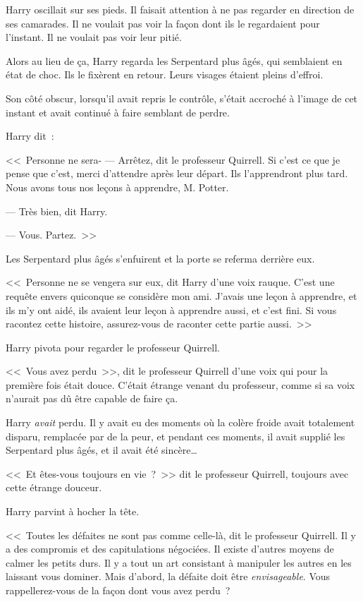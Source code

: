 Harry oscillait sur ses pieds. Il faisait attention à ne pas regarder en direction de ses camarades. Il ne voulait pas voir la façon dont ils le regardaient pour l'instant. Il ne voulait pas voir leur pitié.

Alors au lieu de ça, Harry regarda les Serpentard plus âgés, qui semblaient en état de choc. Ils le fixèrent en retour. Leurs visages étaient pleins d'effroi.

Son côté obscur, lorsqu'il avait repris le contrôle, s'était accroché à l'image de cet instant et avait continué à faire semblant de perdre.

Harry dit~:

<<~Personne ne sera-
--- Arrêtez, dit le professeur Quirrell. Si c'est ce que je pense que c'est, merci d'attendre après leur départ. Ils l'apprendront plus tard. Nous avons tous nos leçons à apprendre, M. Potter.

--- Très bien, dit Harry.

--- Vous. Partez.~>>

Les Serpentard plus âgés s'enfuirent et la porte se referma derrière eux.

<<~Personne ne se vengera sur eux, dit Harry d'une voix rauque. C'est une requête envers quiconque se considère mon ami. J'avais une leçon à apprendre, et ils m'y ont aidé, ils avaient leur leçon à apprendre aussi, et c'est fini. Si vous racontez cette histoire, assurez-vous de raconter cette partie aussi.~>>

Harry pivota pour regarder le professeur Quirrell.

<<~Vous avez perdu~>>, dit le professeur Quirrell d'une voix qui pour la première fois était douce. C'était étrange venant du professeur, comme si sa voix n'aurait pas dû être capable de faire ça.

Harry \emph{avait} perdu. Il y avait eu des moments où la colère froide avait totalement disparu, remplacée par de la peur, et pendant ces moments, il avait supplié les Serpentard plus âgés, et il avait été sincère…

<<~Et êtes-vous toujours en vie~?~>> dit le professeur Quirrell, toujours avec cette étrange douceur.

Harry parvint à hocher la tête.

<<~Toutes les défaites ne sont pas comme celle-là, dit le professeur Quirrell. Il y a des compromis et des capitulations négociées. Il existe d'autres moyens de calmer les petits durs. Il y a tout un art consistant à manipuler les autres en les laissant vous dominer. Mais d'abord, la défaite doit être \emph{envisageable}. Vous rappellerez-vous de la façon dont vous avez perdu~?

